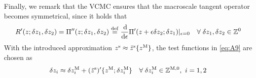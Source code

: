 \documentclass[12pt,a4paper]{article}
\renewcommand{\ta}[1]{\mathbfit{#1}}
\renewcommand{\ts}[1]{\mathbfit{#1}}
\renewcommand{\Box}{\mdlgwhtsquare}
\DeclarePairedDelimiter{\jmp}{[\![}{]\!]}
\newcommand{\rve}{
  {\mathchoice
   {\mbox{\scalebox{0.67}{$\Box$}}}
   {\mbox{\scalebox{0.67}{$\Box$}}}
   {\mbox{\scalebox{0.5}{$\Box$}}}
   {\mbox{\scalebox{0.375}{$\Box$}}}
  }
}
\begin{document}
Finally, we remark that the VCMC ensures that the macroscale tangent operator becomes symmetrical, since it holds that
\begin{align}
\label{eq:A9} R'(z;\delta z_1,\delta z_2) = \Pi''(z;\delta z_1,\delta z_2) \overset{\mathrm{def}}{=} \frac{\operatorname{d \!}}{\operatorname{d \!}\epsilon}\Pi'(z+\epsilon\delta z_2;\delta z_1)|_{\epsilon=0}\quad \forall\;\delta z_1,\delta z_2 \in \mathbb{Z}^0
\end{align}
With the introduced approximation $z^{\mathrm{s}} \approx \tilde{z}^{\mathrm{s}}\{z^{\mathrm{M}}\}$, the test functions in \cref{eq:A9} are chosen as
\begin{align}
\label{eq:A10} \delta z_i \approx \delta z_i^{\mathrm{M}} + (\tilde{z}^{\mathrm{s}})'\{z^{\mathrm{M}};\delta z_i^{\mathrm{M}}\} \quad \forall\;\delta z_i^{\mathrm{M}}\in\mathbb{Z}^{\mathrm{M},0}, \,\, i=1,2
\end{align}


\end{document}
